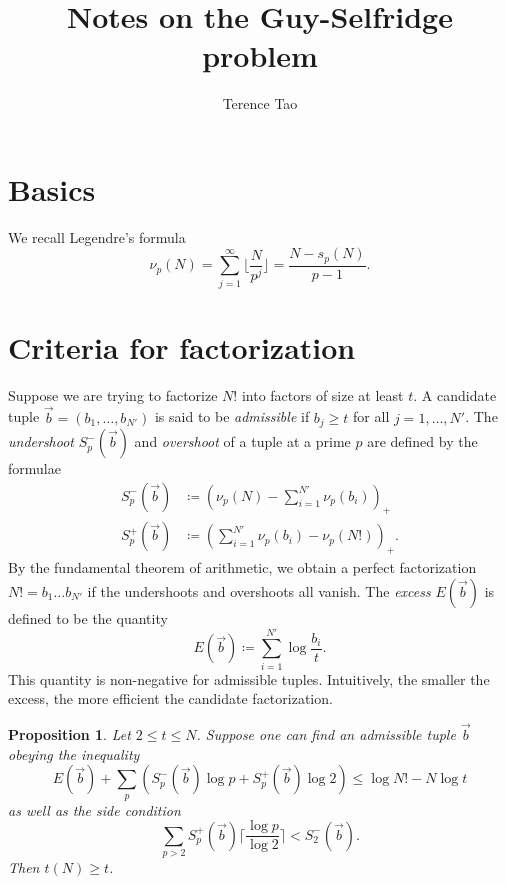 \documentclass[12pt,a4paper,reqno]{amsart}
\numberwithin{equation}{section}
\theoremstyle{plain}
\newtheorem{proposition}[theorem]{Proposition}
\theoremstyle{definition}
\begin{document}
\title{Notes on the Guy-Selfridge problem}

\author{Terence Tao}
\maketitle


\section{Basics}

We recall Legendre's formula
\begin{equation}\label{legendre}
  \nu_p(N) = \sum_{j=1}^\infty \lfloor \frac{N}{p^j} \rfloor = \frac{N - s_p(N)}{p-1}.
\end{equation}

\section{Criteria for factorization}

Suppose we are trying to factorize $N!$ into factors of size at least $t$.  A candidate tuple $\vec b = (b_1,\dots,b_{N'})$ is said to be \emph{admissible} if $b_j \geq t$ for all $j=1,\dots,N'$.  The \emph{undershoot} $S^-_p(\vec b)$ and \emph{overshoot} of a tuple at a prime $p$ are defined by the formulae
\begin{align*}
   S^-_p(\vec b) &\coloneqq (\nu_p(N) - \sum_{i=1}^{N'} \nu_p(b_i))_+ \\
   S^+_p(\vec b) &\coloneqq (\sum_{i=1}^{N'} \nu_p(b_i) - \nu_p(N!))_+.
\end{align*}
By the fundamental theorem of arithmetic, we obtain a perfect factorization $N! = b_1 \dots b_{N'}$ if the undershoots and overshoots all vanish.  The \emph{excess} $E(\vec b)$ is defined to be the quantity
\begin{equation}\label{excess} 
  E(\vec b) \coloneqq \sum_{i=1}^{N'} \log \frac{b_i}{t}.
\end{equation}
This quantity is non-negative for admissible tuples.  Intuitively, the smaller the excess, the more efficient the candidate factorization.

\begin{proposition}  Let $2 \leq t \leq N$.  Suppose one can find an admissible tuple $\vec b$ obeying the inequality
\begin{equation}\label{main} 
  E(\vec b) + \sum_p (S^-_p(\vec b) \log p + S^+_p(\vec b) \log 2) \leq \log N! - N \log t
\end{equation}
as well as the side condition
\begin{equation}\label{side}
 \sum_{p>2} S^+_p(\vec b) \lceil \frac{\log p}{\log 2} \rceil < S^-_2(\vec b).
\end{equation}
Then $t(N) \geq t$.
\end{proposition}
\end{document}
